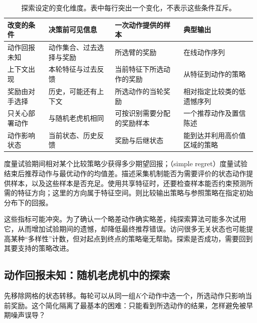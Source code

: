 \begin{table}[t]
  \centering
  \small
  \begin{tabularx}{\linewidth}{>{\raggedright\arraybackslash}p{25mm} >{\raggedright\arraybackslash}X >{\raggedright\arraybackslash}X >{\raggedright\arraybackslash}X}
    \toprule
    改变的条件 & 决策前可见信息 & 一次动作提供的样本 & 典型输出 \\
    \midrule
    动作回报未知 & 动作集合、过去选择与奖励 & 所选臂的奖励 & 在线动作序列 \\
    上下文出现 & 本轮特征与过去反馈 & 当前特征下所选动作的奖励 & 从特征到动作的策略 \\
    奖励由对手选择 & 历史，可能还有上下文 & 所选动作的当轮奖励 & 相对指定比较类的低遗憾序列 \\
    只关心部署动作 & 与随机老虎机相同 & 可按识别需要分配的奖励样本 & 一个推荐动作及置信陈述 \\
    动作影响状态 & 当前状态、历史反馈 & 奖励与后继状态 & 能到达并利用高价值区域的策略 \\
    \bottomrule
  \end{tabularx}
  \caption{探索设定的变化维度。表中每行突出一个变化，不表示这些条件互斥。}
  \label{tab:rl-learning-exploration-settings}
\end{table}

\begin{definition}[探索的几种评价对象]
  \label{def:rl-learning-exploration-objects}
  度量试验期间相对某个比较策略少获得多少期望回报；（simple regret）度量试验结束后推荐动作与最优动作的均值差。描述采集机制能否为需要评价的状态动作提供样本，以及这些样本是否充足。使用共享特征时，还要检查样本能否约束预测所需的特征方向；这里的方向属于特征空间。则比较输出策略与参照策略在指定初始分布下的回报。
\end{definition}

这些指标可能冲突。为了确认一个略差动作确实略差，纯探索算法可能多次试用它，从而增加试验期间的遗憾，却降低最终推荐错误。访问很多无关状态也可能提高某种“多样性”计数，但对起点到终点的策略毫无帮助。探索是否成功，需要回到其要支持的策略改进。

\subsection{动作回报未知：随机老虎机中的探索}
\label{sec:rl-learning-bandits}

先移除网格的状态转移。每轮可以从同一组$K$个动作中选一个，所选动作只影响当前奖励。这个简化隔离了最基本的困难：只能看到所选动作的结果，怎样避免被早期噪声误导？

